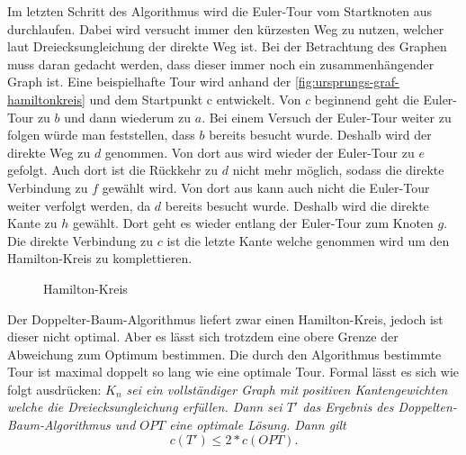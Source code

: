 \documentclass{article}
\begin{document}
Im letzten Schritt des Algorithmus wird die Euler-Tour vom Startknoten aus durchlaufen. Dabei wird versucht immer den kürzesten Weg zu nutzen, welcher laut Dreiecksungleichung der direkte Weg ist. Bei der Betrachtung des Graphen muss daran gedacht werden, dass dieser immer noch ein zusammenhängender Graph ist. Eine beispielhafte Tour wird anhand der \autoref{fig:ursprungs-graf-hamiltonkreis} und dem Startpunkt c entwickelt. Von $c$ beginnend geht die Euler-Tour zu $b$ und dann wiederum zu $a$. Bei einem Versuch der Euler-Tour weiter zu folgen würde man feststellen, dass $b$ bereits besucht wurde. Deshalb wird der direkte Weg zu $d$ genommen. Von dort aus wird wieder der Euler-Tour zu $e$ gefolgt. Auch dort ist die Rückkehr zu $d$ nicht mehr möglich, sodass die direkte Verbindung zu $f$ gewählt wird. Von dort aus kann auch nicht die Euler-Tour weiter verfolgt werden, da $d$ bereits besucht wurde. Deshalb wird die direkte Kante zu $h$ gewählt. Dort geht es wieder entlang der Euler-Tour zum Knoten $g$. Die direkte Verbindung zu $c$ ist die letzte Kante welche genommen wird um den Hamilton-Kreis zu komplettieren.

\begin{figure}[H]
\centering
{}
\caption{Hamilton-Kreis}
\label{fig:ursprungs-graf-hamiltonkreis}
\end{figure}

Der Doppelter-Baum-Algorithmus liefert zwar einen Hamilton-Kreis, jedoch ist dieser nicht optimal. Aber es lässt sich trotzdem eine obere Grenze der Abweichung zum Optimum bestimmen. Die durch den Algorithmus bestimmte Tour ist maximal doppelt so lang wie eine optimale Tour. Formal lässt es sich wie folgt ausdrücken:
\textit{$K_n$ sei ein vollständiger Graph mit positiven Kantengewichten welche die Dreiecksungleichung erfüllen. Dann sei $T'$ das Ergebnis des Doppelten-Baum-Algorithmus und $OPT$ eine optimale Lösung. Dann gilt
\begin{equation}
c(T') \leq 2 * c(OPT).
\label{eq:test}
\end{equation}}
\end{document}
